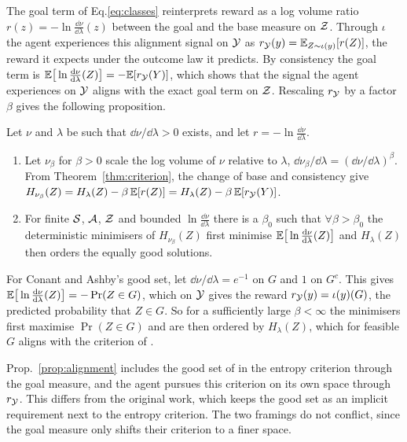 The goal term of Eq.\eqref{eq:classes} reinterprets reward as a log volume ratio $r(z) = -\ln \tfrac{\dd\nu}{\dd\lambda}(z)$ between the goal and the base measure on $\mathcal Z$.
Through $\iota$ the agent experiences this alignment signal on $\mathcal Y$ as $r_\mathcal Y(y) = \mathbb E_{Z \sim \iota(y)}[r(Z)]$, the reward it expects under the outcome law it predicts.
By consistency the goal term is $\mathbb E\big[\ln \tfrac{\mathrm d\nu}{\mathrm d\lambda}(Z)\big] = -\mathbb E[r_\mathcal Y(Y)]$, which shows that the signal the agent experiences on $\mathcal Y$ aligns with the exact goal term on $\mathcal Z$.
Rescaling $r_\mathcal Y$ by a factor $\beta$ gives the following proposition.
\begin{proposition}\label{prop:alignment}
  Let $\nu$ and $\lambda$ be such that $\dd\nu / \dd\lambda > 0$ exists, and let $r = -\ln \tfrac{\dd\nu}{\dd\lambda}$.
  \begin{enumerate}
    \item Let $\nu_\beta$ for $\beta > 0$ scale the log volume of $\nu$ relative to $\lambda$, $\dd\nu_\beta / \dd\lambda = (\dd\nu / \dd\lambda)^{\beta}$.
    From Theorem~\ref{thm:criterion}, the change of base and consistency give $H_{\nu_\beta}(Z) = H_\lambda(Z) - \beta\, \mathbb E[r(Z)] = H_\lambda(Z) - \beta\, \mathbb E[r_\mathcal Y(Y)]$.
    \item For finite $\mathcal S$, $\mathcal A$, $\mathcal Z$ and bounded $\ln \tfrac{\dd\nu}{\dd\lambda}$ there is a $\beta_0$ such that $\forall \beta > \beta_0$ the deterministic minimisers of $H_{\nu_\beta}(Z)$ first minimise $\mathbb E\big[\ln \tfrac{\mathrm d\nu}{\mathrm d\lambda}(Z)\big]$ and $H_\lambda(Z)$ then orders the equally good solutions.
  \end{enumerate}
  For Conant and Ashby's good set, let $\dd\nu / \dd\lambda = e^{-1}$ on $G$ and $1$ on $G^c$.
  This gives $\mathbb E\big[\ln \tfrac{\mathrm d\nu}{\mathrm d\lambda}(Z)\big] = -\Pr(Z \in G)$, which on $\mathcal Y$ gives the reward $r_\mathcal Y(y) = \iota(y)(G)$, the predicted probability that $Z \in G$.
  So for a sufficiently large $\beta < \infty$ the minimisers first maximise $\Pr(Z \in G)$ and are then ordered by $H_\lambda(Z)$, which for feasible $G$ aligns with the criterion of \citet[p.~91]{Conant-good70}.
\end{proposition}
Prop.~\ref{prop:alignment} includes the good set of \citet{Conant-good70} in the entropy criterion through the goal measure, and the agent pursues this criterion on its own space through $r_\mathcal Y$.
This differs from the original work, which keeps the good set as an implicit requirement next to the entropy criterion.
The two framings do not conflict, since the goal measure only shifts their criterion to a finer space.
